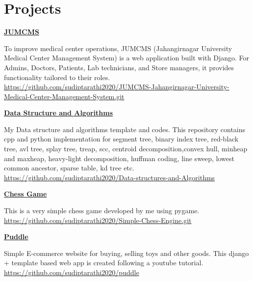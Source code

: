 \documentclass[a4paper,10pt]{article}
\begin{document}
\section*{Projects}
\href{https://github.com/sudiptarathi2020/JUMCMS-Jahangirnagar-University-Medical-Center-Management-System.git}{\textbf{JUMCMS}}
\begin{boxB}
    To improve medical center operations, JUMCMS (Jahangirnagar University Medical Center Management System) is a web application built with Django. For Admins, Doctors, Patients, Lab technicians, and Store managers, it provides functionality tailored to their roles. \\
    \href{https://github.com/sudiptarathi2020/JUMCMS-Jahangirnagar-University-Medical-Center-Management-System.git}{https://github.com/sudiptarathi2020/JUMCMS-Jahangirnagar-University-Medical-Center-Management-System.git}
\end{boxB}


\href{https://github.com/sudiptarathi2020/Data-structures-and-Algorithms}{\textbf{Data Structure and Algorithms}}
\begin{boxB}
    My Data structure and algorithms template and codes. This repository contains cpp and python implementation for segment tree, binary index tree, red-black tree, avl tree, splay tree, treap, scc, centroid decomposition,convex hull, minheap and maxheap, heavy-light decomposition, huffman coding, line sweep, lowest common ancestor, sparse table, kd tree etc.\\ \href{https://github.com/sudiptarathi2020/Data-structures-and-Algorithms}{https://github.com/sudiptarathi2020/Data-structures-and-Algorithms}
\end{boxB}

\href{https://github.com/sudiptarathi2020/Simple-Chess-Engine.git}{\textbf{Chess Game}}
\begin{boxB}
   This is a very simple chess game developed by me using pygame. \\ \href{https://github.com/sudiptarathi2020/Simple-Chess-Engine.git}{https://github.com/sudiptarathi2020/Simple-Chess-Engine.git}
\end{boxB}

\href{https://github.com/sudiptarathi2020/puddle}{\textbf{Puddle}}
\begin{boxB}
    Simple E-commerce website for buying, selling toys and other goods. This django + template based web app is created following a youtube tutorial.\\  \href{https://github.com/sudiptarathi2020/puddle}{https://github.com/sudiptarathi2020/puddle}
\end{boxB}
\end{document}
